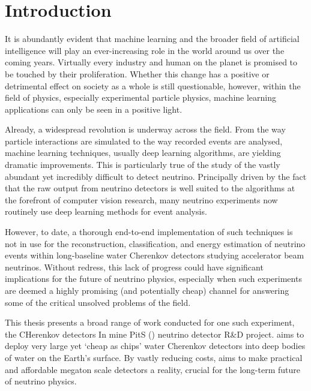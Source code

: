 \chapter{Introduction} %
\label{chap:introduction} %
\setcounter{page}{17}  %

It is abundantly evident that machine learning and the broader field of artificial intelligence
will play an ever-increasing role in the world around us over the coming years. Virtually every
industry and human on the planet is promised to be touched by their proliferation. Whether this
change has a positive or detrimental effect on society as a whole is still questionable, however,
within the field of physics, especially experimental particle physics, machine learning
applications can only be seen in a positive light.

Already, a widespread revolution is underway across the field. From the way particle interactions
are simulated to the way recorded events are analysed, machine learning techniques, usually deep
learning algorithms, are yielding dramatic improvements. This is particularly true of the study of
the vastly abundant yet incredibly difficult to detect neutrino. Principally driven by the fact
that the raw output from neutrino detectors is well suited to the algorithms at the forefront of
computer vision research, many neutrino experiments now routinely use deep learning methods for
event analysis.

However, to date, a thorough end-to-end implementation of such techniques is not in use for the
reconstruction, classification, and energy estimation of neutrino events within long-baseline
water Cherenkov detectors studying accelerator beam neutrinos. Without redress, this lack of
progress could have significant implications for the future of neutrino physics, especially when
such experiments are deemed a highly promising (and potentially cheap) channel for answering some
of the critical unsolved problems of the field.

This thesis presents a broad range of work conducted for one such experiment, the CHerenkov
detectors In mine PitS (\chips) neutrino detector R\&D project. \chips aims to deploy very large
yet `cheap as chips' water Cherenkov detectors into deep bodies of water on the Earth's surface.
By vastly reducing costs, \chips aims to make practical and affordable megaton scale detectors a
reality, crucial for the long-term future of neutrino physics.

